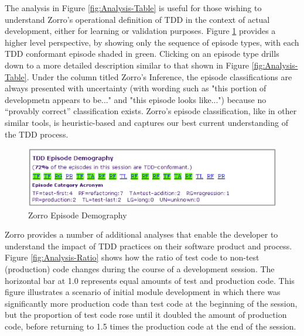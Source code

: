 \documentclass[smallextended]{svjour3}     %
\begin{document}
The analysis in Figure \ref{fig:Analysis-Table} is useful for those wishing
to understand Zorro's operational definition of TDD in the context of
actual development, either for learning or validation purposes.  Figure
\ref{fig:Analysis-Demography} provides a higher level perspective, by
showing only the sequence of episode types, with each TDD conformant
episode shaded in green. Clicking on an episode type drills down to a more
detailed description similar to that shown in Figure
\ref{fig:Analysis-Table}. Under the column titled Zorro's Inference, the episode classifications are always 
presented with uncertainty (with wording such as "this portion of developmetn appears to be..." and "this episode looks like...") because no ``provably correct'' classification exists. Zorro's episode classification, like in other similar tools, is heuristic-based and captures our best current understanding of the TDD process. 

\begin{figure}[th]
  \center
  \includegraphics[width=1.0\textwidth]{zorro-episode-demography.eps}
  \caption{Zorro Episode Demography}
  \label{fig:Analysis-Demography}
\end{figure} 

Zorro provides a number of additional analyses that enable the developer to
understand the impact of TDD practices on their software product and
process.  Figure \ref{fig:Analysis-Ratio} shows how the ratio of test code
to non-test (production) code changes during the course of a development
session.  The horizontal bar at 1.0 represents equal amounts of test and
production code.  This figure illustrates a scenario of initial module
development in which there was significantly more production code than test
code at the beginning of the session, but the proportion of test code rose
until it doubled the amount of production code, before returning to 1.5
times the production code at the end of the session.
\end{document}
